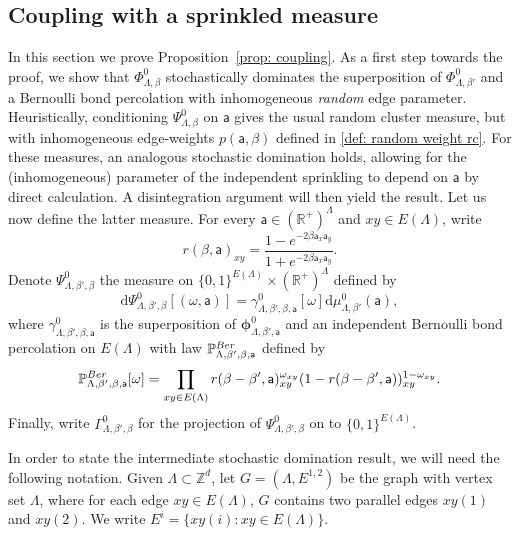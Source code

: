\documentclass[11pt,a4paper]{article}
\theoremstyle{definition}
\numberwithin{equation}{section}
\newcommand\R{\mathbb{R}}
\begin{document}
\subsection{Coupling with a sprinkled measure}\label{sec: proof of coupling}

In this section we prove Proposition~\ref{prop: coupling}. As a first step towards the proof, we show that $\Phi^0_{\Lambda,\beta}$ stochastically dominates the superposition of $\Phi^0_{\Lambda,\beta'}$ and a Bernoulli bond percolation with inhomogeneous \emph{random} edge parameter.
Heuristically, conditioning $\Psi^0_{\Lambda,\beta}$ on $\mathsf a$ gives the usual random cluster measure, but with inhomogeneous edge-weights $p(\mathsf a,\beta)$ defined in \eqref{def: random weight rc}.
For these measures, an analogous stochastic domination holds, allowing for the (inhomogeneous) parameter of the independent sprinkling to depend on $\mathsf a$ by direct calculation. A disintegration argument will then yield the result. Let us now define the latter measure. For every $\mathsf{a}\in (\mathbb{R}^+)^{\Lambda}$ and $xy\in E(\Lambda)$, write
\begin{equation}
r(\beta,\mathsf{a})_{xy}=\frac{1-e^{-2\beta\mathsf{a}_x\mathsf{a}_y}}{1+e^{-2\beta\mathsf{a}_x\mathsf{a}_y}}.
\end{equation}
Denote $\Psi^0_{\Lambda,\beta',\beta}$ the measure on $\{0,1\}^{E(\Lambda)} \times (\R^+)^{\Lambda}$
defined by
\begin{equation}
\mathrm{d}\Psi_{\Lambda,\beta',\beta}^0[(\omega,\mathsf{a})]=\gamma^0_{\Lambda,\beta',\beta,\mathsf{a}}[\omega] \mathrm{d}\mu_{\Lambda,\beta'}^0(\mathsf{a}),
\end{equation}
where $\gamma^0_{\Lambda,\beta',\beta,\mathsf{a}}$ is the superposition of $\boldsymbol{\phi}^0_{\Lambda,\beta', \mathsf a}$ and an independent Bernoulli bond percolation on $E(\Lambda)$ with law $\mathbb{P}_{\Lambda,\beta',\beta,\mathsf{a}}^{\rm Ber}$ defined by
\begin{equation}
\mathbb{P}_{\Lambda,\beta',\beta,\mathsf{a}}^{\rm Ber}[\omega]=\prod_{xy \in E(\Lambda)} r(\beta-\beta',\mathsf{a})_{xy}^{\omega_{xy}} (1-r(\beta-\beta',\mathsf{a}))_{xy}^{1-\omega_{xy}}.     
\end{equation}
Finally, write $\Gamma^0_{\Lambda,\beta',\beta}$ for the projection of $\Psi^0_{\Lambda,\beta',\beta}$ on to $\{0,1\}^{E(\Lambda)}$.

In order to state the intermediate stochastic domination result, we will need the following notation. Given $\Lambda\subset \mathbb{Z}^d$, let $G=(\Lambda,E^{1,2})$ be the graph with vertex set $\Lambda$, where for each edge $xy\in E(\Lambda)$, $G$ contains two parallel edges $xy(1)$ and $xy(2)$. We write $E^i=\{xy(i) : xy\in E(\Lambda)\}$. 
\end{document}
